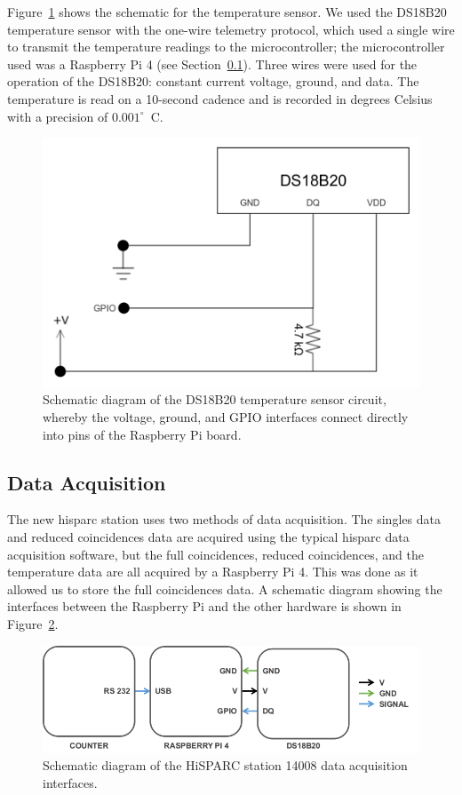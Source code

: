 Figure~\ref{fig:temperature_sensor_circuit} shows the schematic for the temperature sensor. We used the DS18B20 temperature sensor with the one-wire telemetry protocol, which used a single wire to transmit the temperature readings to the microcontroller; the microcontroller used was a Raspberry Pi 4 (see Section~\ref{sec:HS14008_data_acqusition}). Three wires were used for the operation of the DS18B20: constant current voltage, ground, and data. The temperature is read on a 10-second cadence and is recorded in degrees Celsius with a precision of $0.001^{\circ}$~C. 

\begin{figure}[ht!]
	\centering
	\includegraphics[width=0.6\columnwidth]{HS_14008_temp_circuit.png}
	\caption{Schematic diagram of the DS18B20 temperature sensor circuit, whereby the voltage, ground, and GPIO interfaces connect directly into pins of the Raspberry Pi board.}
	\label{fig:temperature_sensor_circuit}
\end{figure}




\subsection{Data Acquisition}
\label{sec:HS14008_data_acqusition}

The new \gls{hisparc} station uses two methods of data acquisition. The singles data and reduced coincidences data are acquired using the typical \gls{hisparc} data acquisition software, but the full coincidences, reduced coincidences, and the temperature data are all acquired by a Raspberry Pi 4. This was done as it allowed us to store the full coincidences data. A schematic diagram showing the interfaces between the Raspberry Pi and the other hardware is shown in Figure~\ref{fig:14008_RP4}.

\begin{figure}[ht!]
	\center
	\includegraphics[width=0.8\columnwidth]{14008_data_acq_config.png}
	\caption{Schematic diagram of the HiSPARC station 14008 data acquisition interfaces.}
	\label{fig:14008_RP4}
\end{figure}


